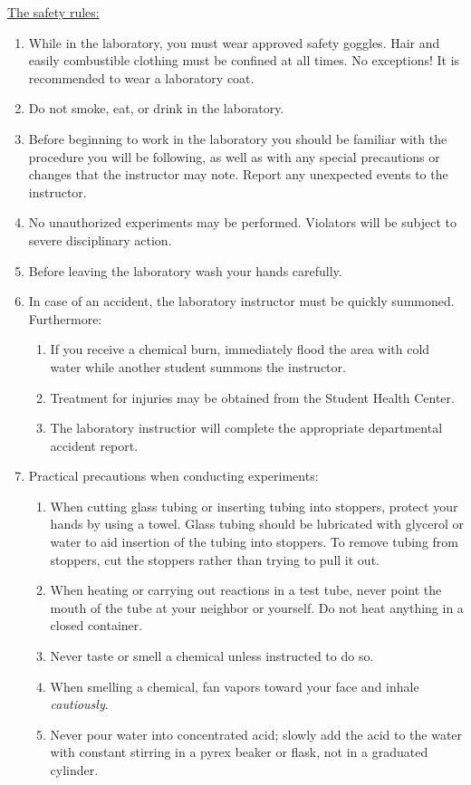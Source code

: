\documentclass[byrevtex,amssymb,aps,pra,floatfix,letterpaper]{revtex4}
\begin{document}
\noindent
\underline{The safety rules:}
\begin{enumerate}
\item While in the laboratory, you must wear approved safety goggles. Hair and easily combustible clothing must be confined at all times. No exceptions! It is recommended to wear a laboratory coat.
\item Do not smoke, eat, or drink in the laboratory.
\item Before beginning to work in the laboratory you should be familiar with the procedure you will be following, as well as with any special precautions or changes that the instructor may note. Report any unexpected events to the instructor.
\item No unauthorized experiments may be performed. Violators will be subject to severe disciplinary action.
\item Before leaving the laboratory wash your hands carefully.
\item In case of an accident, the laboratory instructor must be quickly summoned. Furthermore:
\begin{enumerate}
\item If you receive a chemical burn, immediately flood the area with cold water while another student summons the instructor.
\item Treatment for injuries may be obtained from the Student Health Center.
\item The laboratory instructior will complete the appropriate departmental accident report.
\end{enumerate}
\item Practical precautions when conducting experiments:
\begin{enumerate}
\item When cutting glass tubing or inserting tubing into stoppers, protect your hands by using a towel. Glass tubing should be lubricated with glycerol or water to aid insertion of the tubing into stoppers. To remove tubing from stoppers, cut the stoppers rather than trying to pull it out.
\item When heating or carrying out reactions in a test tube, never point the mouth of the tube at your neighbor or yourself. Do not heat anything in a closed container.
\item Never taste or smell a chemical unless instructed to do so.
\item When smelling a chemical, fan vapors toward your face and inhale \textit{cautiously}.
\item Never pour water into concentrated acid; slowly add the acid to the water with constant stirring in a pyrex beaker or flask, not in a graduated cylinder.

\end{enumerate}
\end{enumerate}
\end{document}
